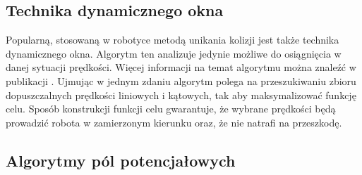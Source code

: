 	\subsection{Technika dynamicznego okna} \label{subsec:dynamic_window}
	Popularną, stosowaną w robotyce metodą unikania kolizji jest także technika dynamicznego okna. Algorytm ten analizuje jedynie możliwe do osiągnięcia w danej sytuacji prędkości.
	Więcej informacji na temat algorytmu można znaleźć w publikacji \cite{dynamic_window}.
	Ujmując w jednym zdaniu algorytm polega na przeszukiwaniu zbioru dopuszczalnych prędkości liniowych i kątowych, tak aby maksymalizować funkcję celu. Sposób konstrukcji funkcji celu
	gwarantuje, że wybrane prędkości będą prowadzić robota w zamierzonym kierunku oraz, że nie natrafi na przeszkodę.
\subsection{Algorytmy pól potencjałowych}
